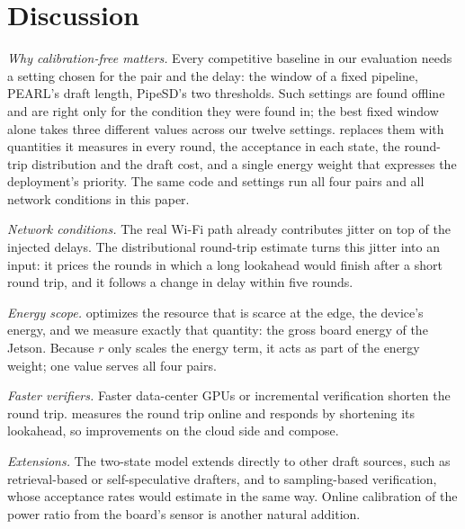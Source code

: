 \section{Discussion}
\label{sec:discussion}

\emph{Why calibration-free matters.} Every competitive baseline in our evaluation needs a setting chosen for the pair and the delay: the window of a fixed pipeline, PEARL's draft length, PipeSD's two thresholds. Such settings are found offline and are right only for the condition they were found in; the best fixed window alone takes three different values across our twelve settings. \cape{} replaces them with quantities it measures in every round, the acceptance in each state, the round-trip distribution and the draft cost, and a single energy weight that expresses the deployment's priority. The same code and settings run all four pairs and all network conditions in this paper.

\emph{Network conditions.} The real Wi-Fi path already contributes jitter on top of the injected delays. The distributional round-trip estimate turns this jitter into an input: it prices the rounds in which a long lookahead would finish after a short round trip, and it follows a change in delay within five rounds.

\emph{Energy scope.} \cape{} optimizes the resource that is scarce at the edge, the device's energy, and we measure exactly that quantity: the gross board energy of the Jetson. Because $r$ only scales the energy term, it acts as part of the energy weight; one value serves all four pairs.

\emph{Faster verifiers.} Faster data-center GPUs or incremental verification shorten the round trip. \cape{} measures the round trip online and responds by shortening its lookahead, so improvements on the cloud side and \cape{} compose.

\emph{Extensions.} The two-state model extends directly to other draft sources, such as retrieval-based or self-speculative drafters, and to sampling-based verification, whose acceptance rates \cape{} would estimate in the same way. Online calibration of the power ratio from the board's sensor is another natural addition.

